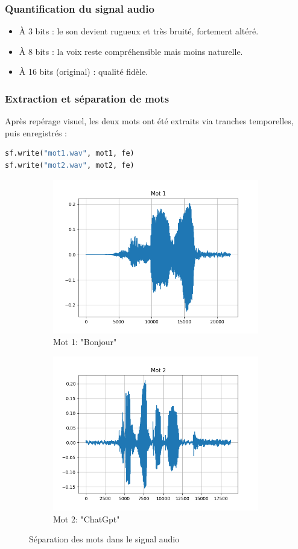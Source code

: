 \subsubsection{Quantification du signal audio}

\begin{itemize}
    \item À 3 bits : le son devient rugueux et très bruité, fortement altéré.
    \item À 8 bits : la voix reste compréhensible mais moins naturelle.
    \item À 16 bits (original) : qualité fidèle.
\end{itemize}

\subsubsection{Extraction et séparation de mots}

Après repérage visuel, les deux mots ont été extraits via tranches temporelles, puis enregistrés :

\begin{lstlisting}[language=python]
sf.write("mot1.wav", mot1, fe)
sf.write("mot2.wav", mot2, fe)
\end{lstlisting}

\begin{figure}[h]
\centering
\begin{subfigure}[b]{0.45\textwidth}
    \centering
    \includegraphics[width=9cm]{screenshots/mot1_graphe.png}
    \caption{Mot 1: "Bonjour"}
\end{subfigure}
\hfill
\begin{subfigure}[b]{0.45\textwidth}
    \centering
    \includegraphics[width=9cm]{screenshots/mot2_graphe.png}
    \caption{Mot 2: "ChatGpt"}
\end{subfigure}
\caption{Séparation des mots dans le signal audio}
\end{figure}



